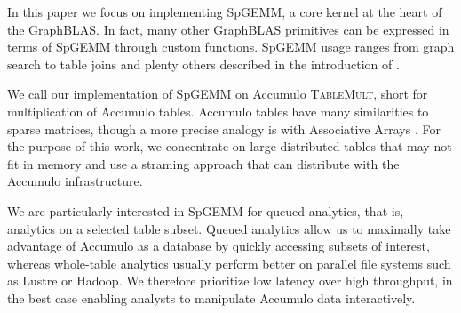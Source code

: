
In this paper we focus on implementing SpGEMM, a core kernel at the
heart of the GraphBLAS.
In fact, many other GraphBLAS primitives can be expressed in terms of
SpGEMM through custom functions. SpGEMM usage ranges from graph search \cite{kepner2011graph} to table joins \cite{cohen2009mad} 
and plenty others described in the introduction of \cite{bulucc2010highly}.


We call our implementation of SpGEMM on Accumulo \textsc{TableMult}, short for multiplication of Accumulo tables.
Accumulo tables have many similarities to sparse matrices, though a more precise analogy is with Associative Arrays 
\cite{kepner2014gabb}. For the purpose of this work, we concentrate on
large distributed tables that may not fit in memory and use a straming
approach that can distribute with the Accumulo infrastructure.

We are particularly interested in SpGEMM for queued analytics, that is, analytics on a selected table subset.  
Queued analytics allow us to maximally take advantage of Accumulo as a database 
by quickly accessing subsets of interest, 
whereas whole-table analytics usually perform better on parallel file systems such as Lustre or Hadoop.
We therefore prioritize low latency over high throughput, %
in the best case enabling analysts to manipulate Accumulo data interactively.

